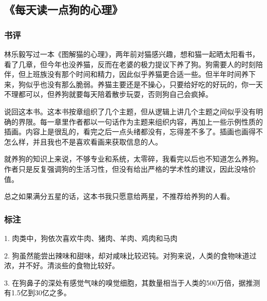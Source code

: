 \subsection{《每天读一点狗的心理》}

\subsubsection{书评}
林乐毅写过一本《图解猫的心理》，两年前对猫感兴趣，想和猫一起晒太阳看书，看了几章，但今年也没养猫，反而在老婆的极力提议下养了狗。狗需要人的时刻陪伴，但上班族没有那个时间和精力，因此似乎养猫更合适一些。但半年时间养下来，狗似乎也没有那么脆弱。养猫主要还是不操心，只要给好吃的好玩的，你一天不理都可以，但养狗就要每天陪着散步玩耍，否则狗自己会疯掉。

说回这本书。这本书按章组织了几个主题，但从逻辑上讲几个主题之间似乎没有明确的界限。每一章里作者都以一句话作为主题来组织内容，再加上一些示例性质的插画。内容上是很乱的，看完之后一点头绪都没有，忘得差不多了。插画也画得不怎么样，并且我也不是喜欢看画来获取信息的人。

就养狗的知识上来说，不够专业和系统，太零碎，我看完以后也不知道怎么养狗。作者只是反复强调狗的生活习性，但没有给出严格的学术性的建议，因此没啥价值。

总之如果满分五星的话，这本书我只愿意给两星，不推荐给养狗的人看。

\subsubsection{标注}
1. 肉类中，狗依次喜欢牛肉、猪肉、羊肉、鸡肉和马肉

2. 狗虽然能尝出辣味和甜味，却对咸味比较迟钝。对狗来说，人类的食物味道过浓，并不好。清淡些的食物比较好。

3. 在狗鼻子的深处有感觉气味的嗅觉细胞，其数量相当于人类的500万倍，据推测有1.5亿到30亿之多。
